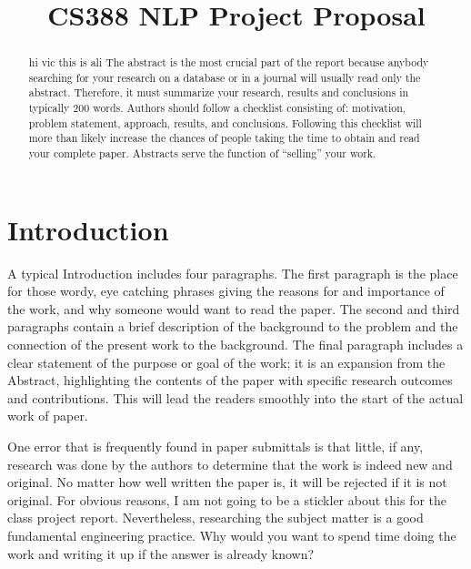 \documentclass[conference]{IEEEtran}
\begin{document}
\title{CS388 NLP Project Proposal}

\author{
\and
{}
\and
{}
}

\maketitle

\begin{abstract}
hi vic this is ali
The abstract is the most crucial part of the report because anybody searching for your research on a database or in a journal will usually read only the abstract. Therefore, it must summarize your research, results and conclusions in typically 200 words.  Authors should follow a checklist consisting of: motivation, problem statement, approach, results, and conclusions. Following this checklist will more than likely increase the chances of people taking the time to obtain and read your complete paper. Abstracts serve the function of ``selling'' your work.

\end{abstract}

\section{Introduction}

A typical Introduction includes four paragraphs. The first paragraph is the place for those wordy, eye catching phrases giving the reasons for and importance of the work, and why someone would want to read the paper. The second and third paragraphs contain a brief description of the background to the problem and the connection of the present work to the background. The final paragraph includes a clear statement of the purpose or goal of the work; it is an expansion from the Abstract, highlighting the contents of the paper with specific research outcomes and contributions. This will lead the readers smoothly into the start of the actual work of paper.

One error that is frequently found in paper submittals is that little, if any, research was done by the authors to determine that the work is indeed new and original. No matter how well written the paper is, it will be rejected if it is not original. For obvious reasons, I am not going to be a stickler about this for the class project report. ­Nevertheless, researching the subject matter is a good fundamental engineering practice. Why would you want to spend time doing the work and writing it up if the answer is already known?
\end{document}
